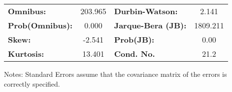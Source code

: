 \begin{center}
\begin{tabular}{lcccccc}
\bottomrule
\end{tabular}
\begin{tabular}{lclc}
\textbf{Omnibus:}       & 203.965 & \textbf{  Durbin-Watson:     } &    2.141  \\
\textbf{Prob(Omnibus):} &   0.000 & \textbf{  Jarque-Bera (JB):  } & 1809.211  \\
\textbf{Skew:}          &  -2.541 & \textbf{  Prob(JB):          } &     0.00  \\
\textbf{Kurtosis:}      &  13.401 & \textbf{  Cond. No.          } &     21.2  \\
\bottomrule
\end{tabular}
\end{center}

Notes: \newline
 [1] Standard Errors assume that the covariance matrix of the errors is correctly specified.